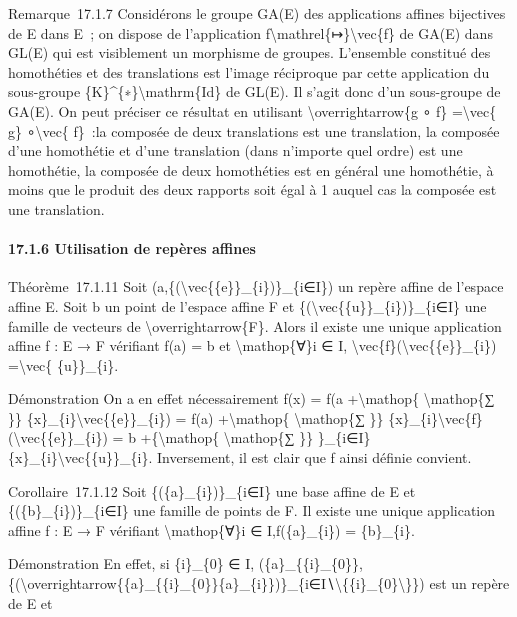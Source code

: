 \documentclass[]{article}
\begin{document}
Remarque~17.1.7 Considérons le groupe GA(E) des applications affines
bijectives de E dans E~; on dispose de l'application
f\textbackslash{}mathrel\{↦\}\textbackslash{}vec\{f\} de GA(E) dans
GL(E) qui est visiblement un morphisme de groupes. L'ensemble constitué
des homothéties et des translations est l'image réciproque par cette
application du sous-groupe \{K\}\^{}\{∗\}\textbackslash{}mathrm\{Id\} de
GL(E). Il s'agit donc d'un sous-groupe de GA(E). On peut préciser ce
résultat en utilisant \textbackslash{}overrightarrow\{g ∘ f\}
=\textbackslash{}vec\{ g\} ∘\textbackslash{}vec\{ f\}~:la composée de
deux translations est une translation, la composée d'une homothétie et
d'une translation (dans n'importe quel ordre) est une homothétie, la
composée de deux homothéties est en général une homothétie, à moins que
le produit des deux rapports soit égal à 1 auquel cas la composée est
une translation.

\paragraph{17.1.6 Utilisation de repères affines}

Théorème~17.1.11 Soit
(a,\{(\textbackslash{}vec\{\{e\}\}\_\{i\})\}\_\{i∈I\}) un repère affine
de l'espace affine E. Soit b un point de l'espace affine F et
\{(\textbackslash{}vec\{\{u\}\}\_\{i\})\}\_\{i∈I\} une famille de
vecteurs de \textbackslash{}overrightarrow\{F\}. Alors il existe une
unique application affine f : E → F vérifiant f(a) = b et
\textbackslash{}mathop\{∀\}i ∈ I,
\textbackslash{}vec\{f\}(\textbackslash{}vec\{\{e\}\}\_\{i\})
=\textbackslash{}vec\{ \{u\}\}\_\{i\}.

Démonstration On a en effet nécessairement f(x) = f(a
+\textbackslash{}mathop\{ \textbackslash{}mathop\{∑ \}\}
\{x\}\_\{i\}\textbackslash{}vec\{\{e\}\}\_\{i\}) = f(a)
+\textbackslash{}mathop\{ \textbackslash{}mathop\{∑ \}\}
\{x\}\_\{i\}\textbackslash{}vec\{f\}(\textbackslash{}vec\{\{e\}\}\_\{i\})
= b +\{\textbackslash{}mathop\{ \textbackslash{}mathop\{∑ \}\}
\}\_\{i∈I\}\{x\}\_\{i\}\textbackslash{}vec\{\{u\}\}\_\{i\}. Inversement,
il est clair que f ainsi définie convient.

Corollaire~17.1.12 Soit \{(\{a\}\_\{i\})\}\_\{i∈I\} une base affine de E
et \{(\{b\}\_\{i\})\}\_\{i∈I\} une famille de points de F. Il existe une
unique application affine f : E → F vérifiant
\textbackslash{}mathop\{∀\}i ∈ I,f(\{a\}\_\{i\}) = \{b\}\_\{i\}.

Démonstration En effet, si \{i\}\_\{0\} ∈ I,
(\{a\}\_\{\{i\}\_\{0\}\},\{(\textbackslash{}overrightarrow\{\{a\}\_\{\{i\}\_\{0\}\}\{a\}\_\{i\}\})\}\_\{i∈I∖\textbackslash{}\{\{i\}\_\{0\}\textbackslash{}\}\})
est un repère de E et
\end{document}
